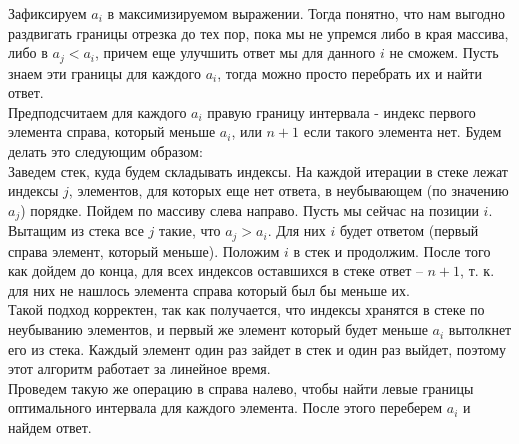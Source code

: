 \documentclass[10pt]{article}
\begin{document}
\begin{itemize}
Зафиксируем $a_i$ в максимизируемом выражении. Тогда понятно, что нам выгодно раздвигать границы отрезка до тех пор, пока мы не упремся либо в края массива, либо в $a_j < a_i$, причем еще улучшить ответ мы для данного $i$ не сможем. Пусть знаем эти границы для каждого $a_i$, тогда можно просто перебрать их и найти ответ.\\
Предподсчитаем для каждого $a_i$ правую границу интервала - индекс первого элемента справа, который меньше $a_i$, или $n+1$ если такого элемента нет. Будем делать это следующим образом: \\
Заведем стек, куда будем складывать индексы. На каждой итерации в стеке лежат индексы $j$, элементов, для которых еще нет ответа, в неубывающем (по значению $a_j$) порядке. Пойдем по массиву слева направо. Пусть мы сейчас на позиции $i$. Вытащим из стека все $j$ такие, что $a_j > a_i$. Для них $i$ будет ответом (первый справа элемент, который меньше). Положим $i$ в стек и продолжим. После того как дойдем до конца, для всех индексов оставшихся в стеке ответ -- $n+1$, т. к. для них не нашлось элемента справа который был бы меньше их.\\
Такой подход корректен, так как получается, что индексы хранятся в стеке по неубыванию элементов, и первый же элемент который будет меньше $a_i$ вытолкнет его из стека. Каждый элемент один раз зайдет в стек и один раз выйдет, поэтому этот алгоритм работает за линейное время.\\
Проведем такую же операцию в справа налево, чтобы найти левые границы оптимального интервала для каждого элемента. После этого переберем $a_i$ и найдем ответ.

\end{itemize}
\end{document}
